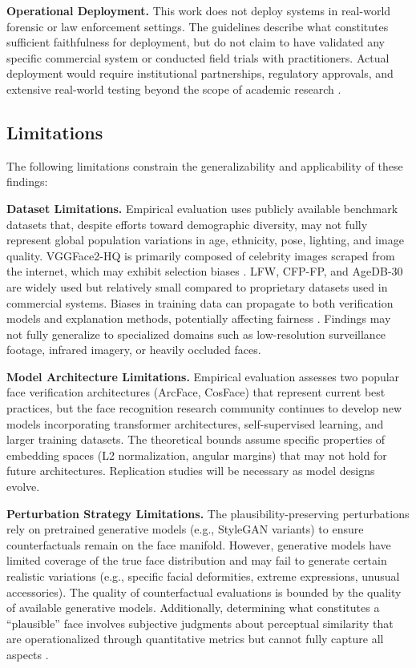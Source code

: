 \textbf{Operational Deployment.} This work does not deploy systems in real-world forensic or law enforcement settings. The guidelines describe what constitutes sufficient faithfulness for deployment, but do not claim to have validated any specific commercial system or conducted field trials with practitioners. Actual deployment would require institutional partnerships, regulatory approvals, and extensive real-world testing beyond the scope of academic research \cite{raji2020closing}.

\subsection{Limitations}

The following limitations constrain the generalizability and applicability of these findings:

\textbf{Dataset Limitations.} Empirical evaluation uses publicly available benchmark datasets that, despite efforts toward demographic diversity, may not fully represent global population variations in age, ethnicity, pose, lighting, and image quality. VGGFace2-HQ is primarily composed of celebrity images scraped from the internet, which may exhibit selection biases \cite{cao2018vggface2}. LFW, CFP-FP, and AgeDB-30 are widely used but relatively small compared to proprietary datasets used in commercial systems. Biases in training data can propagate to both verification models and explanation methods, potentially affecting fairness \cite{buolamwini2018gender}. Findings may not fully generalize to specialized domains such as low-resolution surveillance footage, infrared imagery, or heavily occluded faces.

\textbf{Model Architecture Limitations.} Empirical evaluation assesses two popular face verification architectures (ArcFace, CosFace) that represent current best practices, but the face recognition research community continues to develop new models incorporating transformer architectures, self-supervised learning, and larger training datasets. The theoretical bounds assume specific properties of embedding spaces (L2 normalization, angular margins) that may not hold for future architectures. Replication studies will be necessary as model designs evolve.

\textbf{Perturbation Strategy Limitations.} The plausibility-preserving perturbations rely on pretrained generative models (e.g., StyleGAN variants) to ensure counterfactuals remain on the face manifold. However, generative models have limited coverage of the true face distribution and may fail to generate certain realistic variations (e.g., specific facial deformities, extreme expressions, unusual accessories). The quality of counterfactual evaluations is bounded by the quality of available generative models. Additionally, determining what constitutes a ``plausible'' face involves subjective judgments about perceptual similarity that are operationalized through quantitative metrics but cannot fully capture all aspects \cite{zhang2018lpips}.

